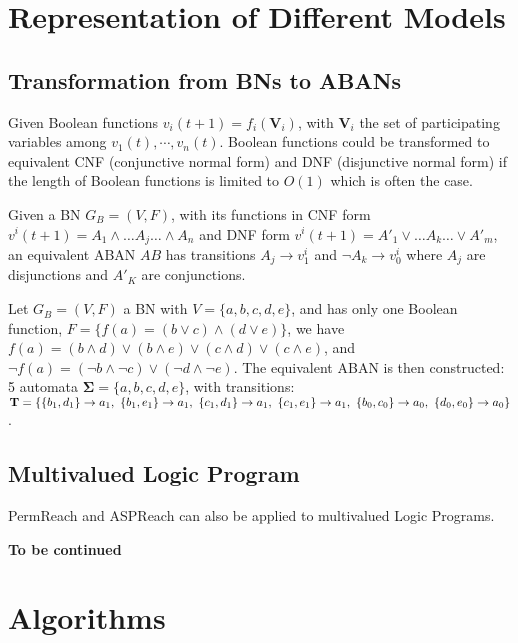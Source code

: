 \chapter{Representation of Different Models}
\section{Transformation from BNs to ABANs}\label{appendix:trans}

Given Boolean functions $v_i(t+1)=f_i(\mathbf{V}_i)$, with $\mathbf{V}_i$ the set of participating variables among $v_1(t),\cdots,v_n(t)$.
Boolean functions could be transformed to equivalent CNF (conjunctive normal form) and DNF (disjunctive normal form) if the length of Boolean functions is limited to $O(1)$ \cite{miltersen2005converting} which is often the case.

\begin{proposition}
Given a BN $G_B=(V,F)$, with its functions in CNF form $v^i(t+1)=A_1\land\ldots A_j \ldots\land A_n$ and DNF form $v^i(t+1)=A'_1\lor\ldots A_k\ldots\lor A'_m$, an equivalent ABAN $AB$ has transitions $A_j\to v^i_1$ and $\lnot A_k\to v^i_0$ where $A_j$ are disjunctions and $A'_K$ are conjunctions.
\end{proposition}

\begin{example}
Let $G_B=(V,F)$ a BN with $V=\{a,b,c,d,e\}$, and has only one Boolean function, $F=\{f(a)= (b\lor c)\land(d\lor e)\}$, we have 
$f(a)=(b\land d)\lor(b\land e)\lor(c\land d)\lor(c\land e)$, and $\lnot f(a)=(\lnot b\land \lnot c)\lor(\lnot d\land \lnot e)$. 
The equivalent ABAN is then constructed: 5 automata $\mathbf{\Sigma}=\{a,b,c,d,e\}$, with transitions: $\mathbf{T}=\{\acm{b_1,d_1}{a_0}{a_1},\ \acm{b_1,e_1}{a_0}{a_1},\ \acm{c_1,d_1}{a_0}{a_1},\ \acm{c_1,e_1}{a_0}{a_1},\ \acm{b_0,c_0}{a_1}{a_0},\ \acm{d_0,e_0}{a_1}{a_0}\}$.
\end{example}

\section{Multivalued Logic Program}
PermReach and ASPReach can also be applied to multivalued Logic Programs.

\textbf{To be continued}

\chapter{Algorithms}\label{chap:algo}

